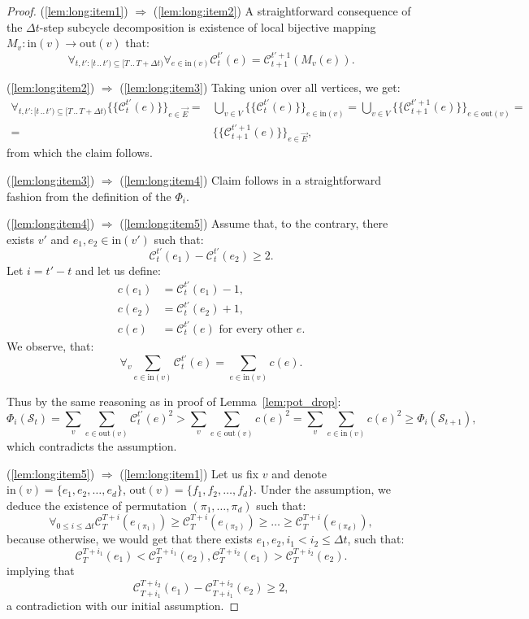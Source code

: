\documentclass{article}[11pt,letter]
\newcommand{\state}{\mathcal{S}}
\newcommand{\inedg}{\mathrm{in}}
\newcommand{\outedg}{\mathrm{out}}
\newcommand{\cload}{\mathcal{C}}
\newcommand{\dt}{\Delta t}
\newcommand{\mset}[1]{\{\!\{#1\}\!\}}
\newcommand{\halfrange}[2]{[#1\,..\,#2)}
\begin{document}
\begin{proof}
(\ref{lem:long:item1}) $\Rightarrow$ (\ref{lem:long:item2})
A straightforward consequence of the $\dt$-step subcycle decomposition is existence of local bijective mapping $M_v : \inedg(v) \to \outedg(v)$ that:
$$\forall_{  t,t' : \halfrange{t}{t'} \subseteq \halfrange{T}{T+\dt} } \forall_{e \in \inedg(v)} \cload_{t}^{t'}(e) = \cload_{t+1}^{t'+1}(M_v(e)).$$


(\ref{lem:long:item2}) $\Rightarrow$ (\ref{lem:long:item3})
Taking union over all vertices, we get:
\begin{align*}\forall_{  t,t' : \halfrange{t}{t'} \subseteq \halfrange{T}{T+\dt} } \mset{\cload_{t}^{t'}(e)}_{e\in \vec{E}} =& \bigcup_{v \in V} \mset{\cload_{t}^{t'}(e)}_{e\in \inedg(v)} = \bigcup_{v \in V} \mset{\cload_{t+1}^{t'+1}(e)}_{e\in \outedg(v)} =\\ =& \mset{\cload_{t+1}^{t'+1}(e)}_{e\in \vec{E}},
\end{align*}
from which the claim follows.


(\ref{lem:long:item3}) $\Rightarrow$ (\ref{lem:long:item4})
Claim follows in a straightforward fashion from the definition of the $\Phi_i$.

(\ref{lem:long:item4}) $\Rightarrow$ (\ref{lem:long:item5})
Assume that, to the contrary, there exists $v'$ and $e_1,e_2 \in \inedg(v')$ such that:
$$ \cload_t^{t'}(e_1) - \cload_t^{t'}(e_2) \ge 2.$$
Let $i = t'-t$ and let us define:
\begin{align*}
c(e_1) &= \cload_t^{t'}(e_1)-1,\\
c(e_2) &= \cload_t^{t'}(e_2)+1,\\
c(e) &= \cload_t^{t'}(e) \text{ for every other } e.
\end{align*}
We observe, that:
$$\forall_v \sum_{e \in \inedg(v)} \cload_t^{t'}(e) = \sum_{e \in \inedg(v)} c(e).$$

Thus by the same reasoning as in proof of Lemma~\ref{lem:pot_drop}:
$$\Phi_i(\state_t) = \sum_v \sum_{e \in \outedg(v)}  \cload_t^{t'}(e)^2 > \sum_v \sum_{e \in \outedg(v)} c(e)^2 = \sum_v \sum_{e \in \inedg(v)} c(e)^2 \ge \Phi_i(\state_{t+1}),$$
which contradicts the assumption.


(\ref{lem:long:item5}) $\Rightarrow$ (\ref{lem:long:item1})
Let us fix $v$ and denote $\inedg(v) = \{e_1,e_2,\ldots,e_d\}$, $\outedg(v) = \{f_1,f_2,\ldots,f_d\}$.
Under the assumption, we deduce the existence of permutation $(\pi_1,\ldots,\pi_d)$ such that:
$$
\forall_{0 \le i \le \dt} \cload_T^{T+i}(e_{(\pi_1)}) \ge \cload_T^{T+i}(e_{(\pi_2)}) \ge \ldots \ge \cload_T^{T+i}(e_{(\pi_d)}),
$$
because otherwise, we would get that there exists $e_1,e_2,i_1<i_2\le\dt$, such that:
$$\cload_T^{T+i_1}(e_1) < \cload_T^{T+i_1}(e_2),\cload_T^{T+i_2}(e_1) > \cload_T^{T+i_2}(e_2).$$
implying that
$$\cload_{T+i_1}^{T+i_2}(e_1) - \cload_{T+i_1}^{T+i_2}(e_2) \ge 2,$$
a contradiction with our initial assumption.


\end{proof}
\end{document}
